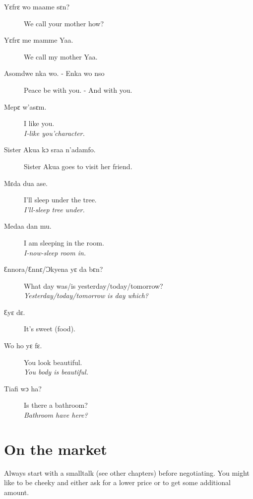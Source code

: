 \documentclass[%
 fontsize=11pt,%
 a5paper,pagesize,
 paper=a5,%
 DIV=9,%
 parskip=half*,%
 twoside=true,
 pointlessnumbers
]{scrbook}%
\begin{document}
\begin{description}
  \item[Yɛfrɛ wo maame sɛn?] We call your mother how?
  \item[Yɛfrɛ me mamme Yaa.] We call my mother Yaa.
  \item[Asomdwe nka wo. - Enka wo nso] Peace be with you. - And with you.
  \item[Mepɛ w'asɛm.] I like you. \\
    \textit{I-like you'character.}
  \item[Sister Akua kɔ sraa n'adamfo.] Sister Akua goes to visit her friend.
  \item[Mɛda dua ase.] I'll sleep under the tree. \\
    \textit{I'll-sleep tree under.}
  \item[Medaa dan mu.] I am sleeping in the room. \\
    \textit{I-now-sleep room in.}
  \item[Ɛnnora/Ɛnnɛ/Ɔkyena yɛ da bɛn?] What day was/is yesterday/today/tomorrow? \\
    \textit{Yesterday/today/tomorrow is day which?}
  \item[Ɛyɛ dɛ.] It's sweet (food).
  \item[Wo ho yɛ fɛ.] You look beautiful. \\
    \textit{You body is beautiful.}
  \item[Tiafi wɔ ha?] Is there a bathroom? \\
    \textit{Bathroom have here?}
\end{description}


\chapter{On the market}

Always start with a smalltalk (see other chapters) before negotiating. You might like to be cheeky and either ask for a lower price or to get some additional amount.
\end{document}
